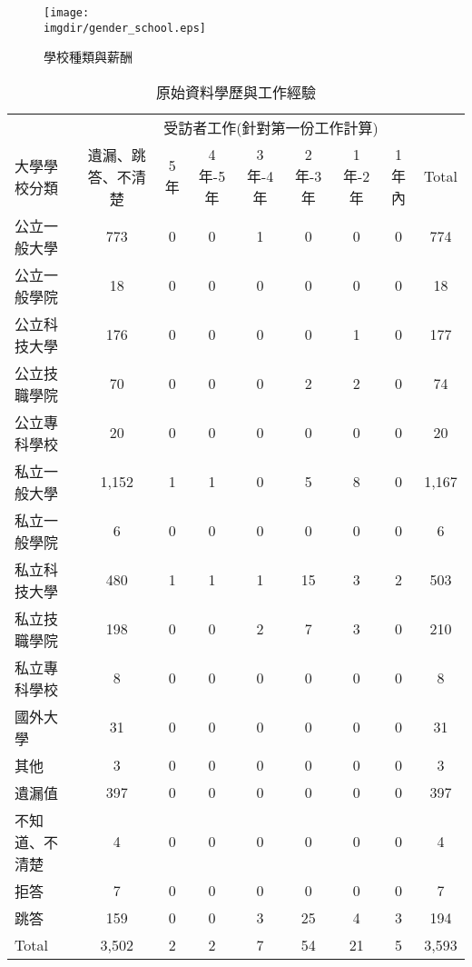 \documentclass[12pt, a4paper]{article}
\begin{document}
\begin{figure}[h]
    \centering    
        \texttt{[image: \\imgdir/gender\_school.eps]}
        \caption{學校種類與薪酬}
        \label{pic:學校種類與薪酬}
\end{figure}









\begin{table}[ht]
\centering
\renewcommand{\arraystretch}{1.3} %
\extrarowheight=4pt
\caption{原始資料學歷與工作經驗}
\begin{adjustbox}{width=\textwidth}
\begin{tabular}{l*{8}{c}}
\toprule
& \multicolumn{8}{c}{受訪者工作(針對第一份工作計算)} \\
\cmidrule(lr){2-9}
\multirow{2}{*}{大學學校分類} & \multirow{2}{*}{遺漏、跳答、不清楚} & \multirow{2}{*}{5年} & \multirow{2}{*}{4年-5年} & \multirow{2}{*}{3年-4年} & \multirow{2}{*}{2年-3年} & \multirow{2}{*}{1年-2年} & \multirow{2}{*}{1年內} & \multirow{2}{*}{Total} \\
& &  &  &  &  & &  &  \\
\midrule
公立一般大學 & 773 & 0 & 0 & 1 & 0 & 0 & 0 & 774 \\
公立一般學院 & 18 & 0 & 0 & 0 & 0 & 0 & 0 & 18 \\
公立科技大學 & 176 & 0 & 0 & 0 & 0 & 1 & 0 & 177 \\
公立技職學院 & 70 & 0 & 0 & 0 & 2 & 2 & 0 & 74 \\
公立專科學校 & 20 & 0 & 0 & 0 & 0 & 0 & 0 & 20 \\
私立一般大學 & 1,152 & 1 & 1 & 0 & 5 & 8 & 0 & 1,167 \\
私立一般學院 & 6 & 0 & 0 & 0 & 0 & 0 & 0 & 6 \\
私立科技大學 & 480 & 1 & 1 & 1 & 15 & 3 & 2 & 503 \\
私立技職學院 & 198 & 0 & 0 & 2 & 7 & 3 & 0 & 210 \\
私立專科學校 & 8 & 0 & 0 & 0 & 0 & 0 & 0 & 8 \\
國外大學 & 31 & 0 & 0 & 0 & 0 & 0 & 0 & 31 \\
其他 & 3 & 0 & 0 & 0 & 0 & 0 & 0 & 3 \\
遺漏值 & 397 & 0 & 0 & 0 & 0 & 0 & 0 & 397 \\
不知道、不清楚 & 4 & 0 & 0 & 0 & 0 & 0 & 0 & 4 \\
拒答 & 7 & 0 & 0 & 0 & 0 & 0 & 0 & 7 \\
跳答 & 159 & 0 & 0 & 3 & 25 & 4 & 3 & 194 \\
Total & 3,502 & 2 & 2 & 7 & 54 & 21 & 5 & 3,593 \\
\bottomrule
\end{tabular}
\end{adjustbox}

\end{table}
\end{document}
